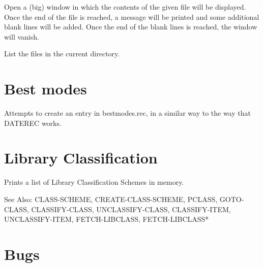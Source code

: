 \begin{description} 
\item[\parbox{\textwidth}{DISPLAYFILE \textit{filename} \textit{bigwin}}]  
Open a (big) window in which the contents of the given file will be displayed.
Once the end of the file is reached, a message will be printed and
some additional blank lines will be added. Once the end of the
blank lines is reached, the window will vanish.

\item[\parbox{\textwidth}{LS}]  
List the files in the current directory.
\item
\end{description}

\section{Best modes}

\begin{description} 
\item[\parbox{\textwidth}{MODEREC}]  
Attempts to create an entry in bestmodes.rec, in a similar way to 
the way that DATEREC works.
\item
\end{description}

\section{Library Classification}

\begin{description} 
\item[\parbox{\textwidth}{PSCHEMES}]  
Prints a list of Library Classification Schemes in memory.

See Also: CLASS-SCHEME, CREATE-CLASS-SCHEME, PCLASS, GOTO-CLASS,
CLASSIFY-CLASS, UNCLASSIFY-CLASS, CLASSIFY-ITEM, UNCLASSIFY-ITEM,
FETCH-LIBCLASS, FETCH-LIBCLASS*
\item
\end{description}

\section{Bugs}

